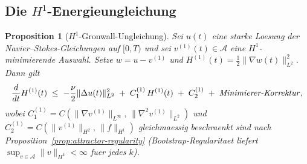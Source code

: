 \documentclass[12pt,a4paper]{article}
\theoremstyle{definition}
\theoremstyle{plain}
\newtheorem{proposition}[definition]{Proposition}
\theoremstyle{remark}
\begin{document}
\subsection{Die $H^1$-Energieungleichung}

\begin{proposition}[$H^1$-Gronwall-Ungleichung]\label{prop:H1-Gronwall}
Sei $u(t)$ eine starke Loesung der Navier--Stokes-Gleichungen
auf $[0,T)$ und sei $v^{(1)}(t) \in \mathcal{A}$ eine $H^1$-minimierende
Auswahl. Setze $w = u - v^{(1)}$ und
$H^{(1)}(t) = \tfrac{1}{2}\|\nabla w(t)\|_{L^2}^2$. Dann gilt
\begin{equation}\label{eq:H1-ineq}
  \frac{d}{dt}H^{(1)}(t)
  \;\le\;
  -\frac{\nu}{2}\|\Delta u(t)\|_{L^2}^2
  \;+\; C_1^{(1)}\,H^{(1)}(t)
  \;+\; C_2^{(1)}
  \;+\; \text{\emph{Minimierer-Korrektur}},
\end{equation}
wobei
$C_1^{(1)} = C(\|\nabla v^{(1)}\|_{L^\infty},\,
\|\nabla^2 v^{(1)}\|_{L^2})$ und
$C_2^{(1)} = C(\|v^{(1)}\|_{H^2},\,\|f\|_{H^1})$
gleichmaessig beschraenkt sind nach Proposition~\ref{prop:attractor-regularity}
(Bootstrap-Regularitaet liefert $\sup_{v \in \mathcal{A}}\|v\|_{H^k}
< \infty$ fuer jedes $k$).
\end{proposition}
\end{document}
